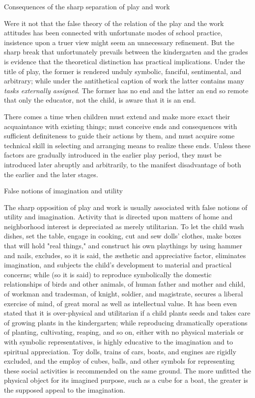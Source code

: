 \documentclass[letterpaper]{book}
\begin{document}
Consequences of the sharp separation of play and work

Were it not that the false theory of the relation of the play and the
work attitudes has been connected with unfortunate modes of school
practice, insistence upon a truer view might seem an unnecessary
refinement. But the sharp break that unfortunately prevails between the
kindergarten and the grades is evidence that the theoretical distinction
has practical implications. Under the title of play, the former is
rendered unduly symbolic, fanciful, sentimental, and arbitrary; while
under the antithetical caption of work the latter
contains
many \emph{tasks externally assigned}. The former has no end and the
latter an end so remote that only the educator, not the child, is aware
that it is an end.

There comes a time when children must extend and make more exact their
acquaintance with existing things; must conceive ends and consequences
with sufficient definiteness to guide their actions by them, and must
acquire some technical skill in selecting and arranging means to realize
these ends. Unless these factors are gradually introduced in the earlier
play period, they must be introduced later abruptly and arbitrarily, to
the manifest disadvantage of both the earlier and the later stages.

False notions of imagination and utility

The sharp opposition of play and work is usually associated with false
notions of utility and imagination. Activity that is directed upon
matters of home and neighborhood interest is depreciated as merely
utilitarian. To let the child wash dishes, set the table, engage in
cooking, cut and sew dolls' clothes, make boxes that will hold "real
things," and construct his own playthings by using hammer and nails,
excludes, so it is said, the æsthetic and appreciative factor,
eliminates imagination, and subjects the child's development to material
and practical concerns; while (so it is said) to reproduce symbolically
the domestic relationships of birds and other animals, of human father
and mother and child, of workman and tradesman, of knight, soldier, and
magistrate, secures a liberal exercise of mind, of great moral as well
as intellectual value. It has been even stated that it is over-physical
and utilitarian if a child plants seeds and takes care of growing plants
in the kindergarten; while reproducing dramatically operations of
planting, cultivating, reaping, and so on,
either
with no physical materials or with symbolic representatives, is highly
educative to the imagination and to spiritual appreciation. Toy dolls,
trains of cars, boats, and engines are rigidly excluded, and the employ
of cubes, balls, and other symbols for representing these social
activities is recommended on the same ground. The more unfitted the
physical object for its imagined purpose, such as a cube for a boat, the
greater is the supposed appeal to the imagination.
\end{document}
